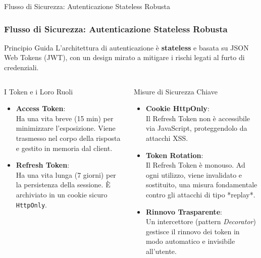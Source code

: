 \documentclass[8pt]{beamer}
\begin{document}
\begin{frame}{Flusso di Sicurezza: Autenticazione Stateless Robusta}
  \frametitle{Flusso di Sicurezza: Autenticazione Stateless Robusta}

  \begin{block}{Principio Guida}
    L'architettura di autenticazione è \textbf{stateless} e basata su JSON Web Tokens (JWT), con un design mirato a mitigare i rischi legati al furto di credenziali.
  \end{block}

  \begin{columns}[T]
    \begin{exampleblock}{I Token e i Loro Ruoli}
      \begin{itemize}
        \item \textbf{Access Token}:\\Ha una vita breve (15 min) per minimizzare l'esposizione. Viene trasmesso nel corpo della risposta e gestito in memoria dal client.

        \item \textbf{Refresh Token}:\\Ha una vita lunga (7 giorni) per la persistenza della sessione. È archiviato in un cookie sicuro \texttt{HttpOnly}.
      \end{itemize}
    \end{exampleblock}

    \begin{alertblock}{Misure di Sicurezza Chiave}
      \begin{itemize}
        \item \textbf{Cookie HttpOnly}:\\Il Refresh Token non è accessibile via JavaScript, proteggendolo da attacchi XSS.

        \item \textbf{Token Rotation}:\\Il Refresh Token è \alert{monouso}. Ad ogni utilizzo, viene invalidato e sostituito, una misura fondamentale contro gli attacchi di tipo *replay*.

        \item \textbf{Rinnovo Trasparente}:\\Un intercettore (pattern \textit{Decorator}) gestisce il rinnovo dei token in modo automatico e invisibile all'utente.
      \end{itemize}
    \end{alertblock}
  \end{columns}
\end{frame}
\end{document}
